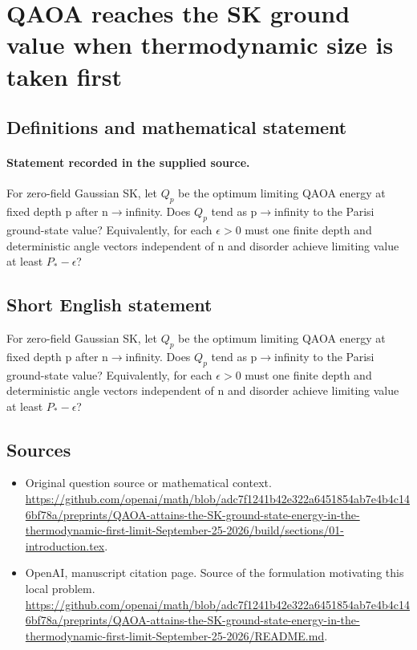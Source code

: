 \documentclass[11pt]{article}
\begin{document}
\section*{QAOA reaches the SK ground value when thermodynamic size is taken first}\label{statement}
\subsection{Definitions and mathematical statement}
\paragraph{Statement recorded in the supplied source.}
For zero-field Gaussian SK, let $Q_p$ be the optimum limiting QAOA energy at fixed depth p after n$\to$infinity. Does $Q_p$ tend as p$\to$infinity to the Parisi ground-state value? Equivalently, for each $\epsilon >0$ must one finite depth and deterministic angle vectors independent of n and disorder achieve limiting value at least $P_*-\epsilon $?
\subsection{Short English statement}
For zero-field Gaussian SK, let $Q_p$ be the optimum limiting QAOA energy at fixed depth p after n$\to$infinity. Does $Q_p$ tend as p$\to$infinity to the Parisi ground-state value? Equivalently, for each $\epsilon >0$ must one finite depth and deterministic angle vectors independent of n and disorder achieve limiting value at least $P_*-\epsilon $?
\subsection{Sources}
\begin{itemize}
\item[S1] Original question source or mathematical context.
\url{https://github.com/openai/math/blob/adc7f1241b42e322a6451854ab7e4b4c146bf78a/preprints/QAOA-attains-the-SK-ground-state-energy-in-the-thermodynamic-first-limit-September-25-2026/build/sections/01-introduction.tex}.
\item[S2] OpenAI, manuscript citation page. Source of the formulation motivating this local problem.
\url{https://github.com/openai/math/blob/adc7f1241b42e322a6451854ab7e4b4c146bf78a/preprints/QAOA-attains-the-SK-ground-state-energy-in-the-thermodynamic-first-limit-September-25-2026/README.md}.
\end{itemize}
\end{document}
